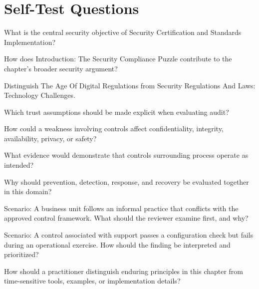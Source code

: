 \documentclass[11pt,letterpaper]{article}
\begin{document}
\section*{Self-Test Questions}
\begin{CornellRecallList}
\item What is the central security objective of Security Certification and Standards Implementation?
\item How does Introduction: The Security Compliance Puzzle contribute to the chapter's broader security argument?
\item Distinguish The Age Of Digital Regulations from Security Regulations And Laws: Technology Challenges.
\item Which trust assumptions should be made explicit when evaluating audit?
\item How could a weakness involving controls affect confidentiality, integrity, availability, privacy, or safety?
\item What evidence would demonstrate that controls surrounding process operate as intended?
\item Why should prevention, detection, response, and recovery be evaluated together in this domain?
\item Scenario: A business unit follows an informal practice that conflicts with the approved control framework. What should the reviewer examine first, and why?
\item Scenario: A control associated with support passes a configuration check but fails during an operational exercise. How should the finding be interpreted and prioritized?
\item How should a practitioner distinguish enduring principles in this chapter from time-sensitive tools, examples, or implementation details?
\end{CornellRecallList}
\end{document}
